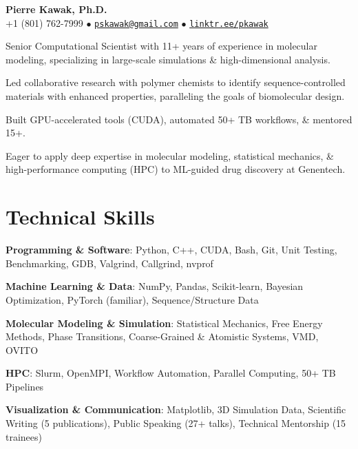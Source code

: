 \begin{center}
  {\LARGE \textbf{Pierre Kawak, Ph.D.} }\\[1ex]
  +1 (801) 762-7999 $\bullet$ \href{mailto:pskawak@gmail.com}{\tt pskawak@gmail.com} $\bullet$ \href{https://linktr.ee/pkawak}{\tt linktr.ee/pkawak}\\
\end{center}
\begin{tabitemize}
  \item Senior Computational Scientist with 11+ years of experience in molecular modeling, specializing in large-scale simulations \& high-dimensional analysis.
  \item Led collaborative research with polymer chemists to identify sequence-controlled materials with enhanced properties, paralleling the goals of biomolecular design.
  \item Built GPU-accelerated tools (CUDA), automated 50+ TB workflows, \& mentored 15+.
  \item Eager to apply deep expertise in molecular modeling, statistical mechanics, \& high-performance computing (HPC) to ML-guided drug discovery at Genentech.
\end{tabitemize}
\vspace{-1.4\baselineskip}
\section*{Technical Skills}
\begin{tabitemize}
  \item \textbf{Programming \& Software}: Python, C++, CUDA, Bash, Git, Unit Testing, Benchmarking, GDB, Valgrind, Callgrind, nvprof
  \item \textbf{Machine Learning \& Data}: NumPy, Pandas, Scikit-learn, Bayesian Optimization, PyTorch (familiar), Sequence/Structure Data
  \item \textbf{Molecular Modeling \& Simulation}: Statistical Mechanics, Free Energy Methods, Phase Transitions, Coarse-Grained \& Atomistic Systems, VMD, OVITO
  \item \textbf{HPC}: Slurm, OpenMPI, Workflow Automation, Parallel Computing, 50+ TB Pipelines
  \item \textbf{Visualization \& Communication}: Matplotlib, 3D Simulation Data, Scientific Writing (5 publications), Public Speaking (27+ talks), Technical Mentorship (15 trainees)
\end{tabitemize}
\vspace{-1.2\baselineskip}
